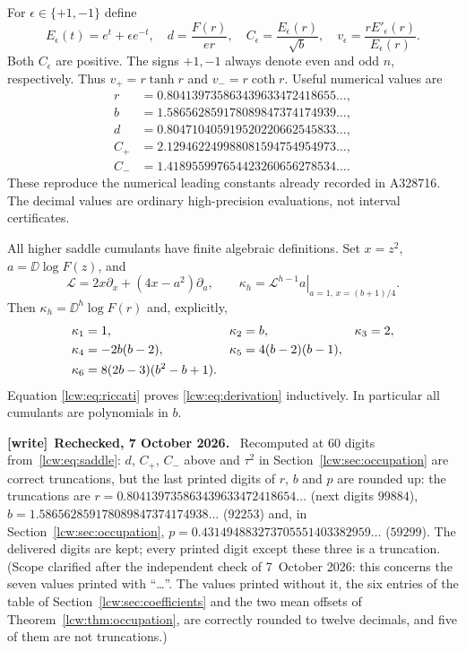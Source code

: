 \documentclass[11pt,letterpaper]{article}
\theoremstyle{remark}\newtheorem{remark}[theorem]{Remark}
\newenvironment{writenote}[1][]{\par\smallskip\begingroup\small
 \noindent\textbf{[write]}\if\relax\detokenize{#1}\relax\else~\textbf{#1.}\fi\ }%
 {\par\endgroup\smallskip}
\begin{document}
For $\epsilon\in\{+1,-1\}$ define
\begin{equation}\label{lcw:eq:constants}
 E_\epsilon(t)=e^t+\epsilon e^{-t},\quad
 d=\frac{F(r)}{er},\quad C_\epsilon=\frac{E_\epsilon(r)}{\sqrt b},\quad
 v_\epsilon=\frac{rE'_\epsilon(r)}{E_\epsilon(r)}.
\end{equation}
Both $C_\epsilon$ are positive. The signs $+1,-1$ always denote even and odd $n$, respectively. Thus
$v_+=r\tanh r$ and $v_-=r\coth r$. Useful numerical values are
\begin{align*}
 r&=0.804139735863439633472418655\ldots,\\
 b&=1.586562859178089847374174939\ldots,\\
 d&=0.804710405919520220662545833\ldots,\\
 C_+&=2.129462249988081594754954973\ldots,\\
 C_-&=1.418955997654423260656278534\ldots.
\end{align*}
These reproduce the numerical leading constants already recorded in A328716. The decimal values are ordinary high-precision evaluations, not interval certificates.

All higher saddle cumulants have finite algebraic definitions. Set $x=z^2$, $a=\DD\log F(z)$, and
\begin{equation}\label{lcw:eq:derivation}
 \mathcal L=2x\partial_x+(4x-a^2)\partial_a,\qquad
 \kappa_h=\left.\mathcal L^{h-1}a\right|_{a=1,\,x=(b+1)/4}.
\end{equation}
Then $\kappa_h=\DD^h\log F(r)$ and, explicitly,
\begin{align}
 \kappa_1&=1,& \kappa_2&=b,&\kappa_3&=2,\notag\\
 \kappa_4&=-2b(b-2),&\kappa_5&=4(b-2)(b-1),\notag\\
 \kappa_6&=8(2b-3)(b^2-b+1).\label{lcw:eq:cumulants}
\end{align}
Equation \eqref{lcw:eq:riccati} proves \eqref{lcw:eq:derivation} inductively. In particular all cumulants are polynomials in $b$.

\begin{writenote}[Rechecked, 7 October 2026]
Recomputed at 60 digits from~\eqref{lcw:eq:saddle}: $d$, $C_+$, $C_-$ above
and $\tau^2$ in Section~\ref{lcw:sec:occupation} are correct truncations, but
the last printed digits of $r$, $b$ and $p$ are rounded up: the truncations
are $r=0.804139735863439633472418654\ldots$ (next digits $99884$),
$b=1.586562859178089847374174938\ldots$ ($92253$) and, in
Section~\ref{lcw:sec:occupation}, $p=0.431494883273705551403382959\ldots$
($59299$). The delivered digits are kept; every printed digit except these
three is a truncation.
(Scope clarified after the independent check of 7~October 2026: this
concerns the seven values printed with ``\ldots''. The values printed
without it, the six entries of the table of
Section~\ref{lcw:sec:coefficients} and the two mean offsets of
Theorem~\ref{lcw:thm:occupation}, are correctly rounded to twelve decimals,
and five of them are not truncations.)
\end{writenote}
\end{document}
